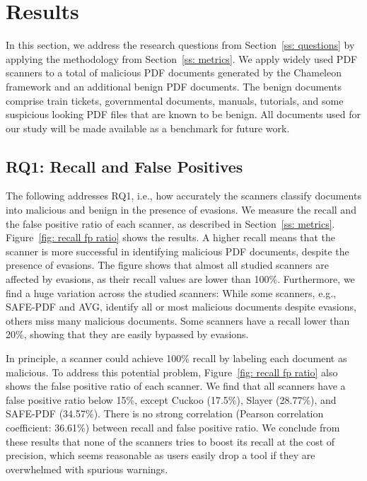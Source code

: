 
\section{Results}
\label{ss: results}

In this section, we address the research questions from Section~\ref{ss: questions} 
by applying the methodology from Section~\ref{ss: metrics}.
We apply \nbAnalyzers{} widely used PDF scanners to a total of \nbSamplesSize{} malicious PDF documents generated by the Chameleon framework and an additional \nbBenignsSize{} benign PDF documents.
The benign documents comprise train tickets, governmental documents, manuals, tutorials, and some suspicious looking PDF files that are known to be benign.
All documents used for our study will be made available as a benchmark for future work.

\subsection{RQ1: Recall and False Positives}
\label{ss: recall fps}

The following addresses RQ1, i.e., how accurately the scanners classify 
documents into malicious and benign in the presence of evasions.
We measure the recall and the false positive 
ratio of each scanner, as described in Section~\ref{ss: metrics}.
Figure~\ref{fig: recall fp ratio} shows the results.
A higher recall means that the scanner is more successful in 
identifying malicious PDF documents, despite the presence of evasions.
The figure shows that almost all studied scanners are affected by evasions, 
as their recall values are lower than 100\%.
Furthermore, we find a huge variation across the studied scanners: While 
some scanners, e.g., SAFE-PDF and AVG, identify all or most malicious documents despite 
evasions, others miss many malicious documents.
Some scanners have a recall lower than 20\%, showing that they are easily 
bypassed by evasions.

In principle, a scanner could achieve 100\% recall by labeling each document 
as malicious.
To address this potential problem, Figure~\ref{fig: recall fp ratio} also 
shows the false positive ratio of each scanner.
We find that all scanners have a false positive ratio below 15\%, except Cuckoo (17.5\%), Slayer (28.77\%), and SAFE-PDF (34.57\%).
There is no strong correlation (Pearson correlation coefficient: 36.61\%) between recall and false positive ratio.
We conclude from these results that none of the scanners tries to boost its 
recall at the cost of precision, which seems reasonable as users easily drop 
a tool if they are overwhelmed with spurious warnings.


